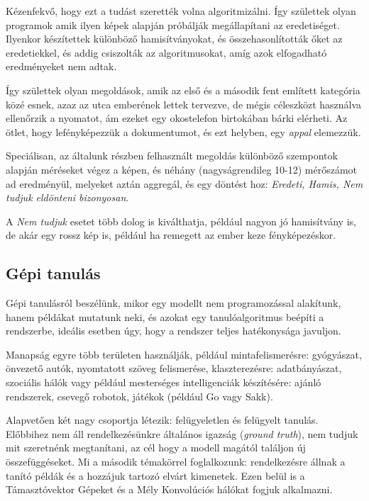 Kézenfekvő, hogy ezt a tudást szerették volna algoritmizálni. Így születtek olyan
programok amik ilyen képek alapján próbálják megállapítani az eredetiséget. 
Ilyenkor készítettek különböző hamisítványokat, és összehasonlították őket az eredetiekkel,
és addig csiszolták az algoritmusokat, amíg azok elfogadható eredményeket nem adtak.


Így születtek olyan megoldások, amik az első és a második fent említett kategória 
közé esnek, azaz az utca emberének lettek tervezve, de mégis céleszközt használva
ellenőrzik a nyomatot, ám ezeket egy okostelefon birtokában bárki elérheti.
Az ötlet, hogy lefényképezzük a dokumentumot, és ezt helyben, egy \textit{appal} elemezzük.


Speciálisan, az általunk részben felhasznált megoldás különböző szempontok alapján méréseket
végez a képen, és néhány (nagyságrendileg 10-12) mérőszámot ad eredményül, melyeket aztán
aggregál, és egy döntést hoz: \textit{Eredeti, Hamis, Nem tudjuk eldönteni bizonyosan}.

A \textit{Nem tudjuk} esetet több dolog is kiválthatja, például nagyon jó hamisítvány is,
de akár egy rossz kép is, például ha remegett az ember keze fényképezéskor.

\subsection{Gépi tanulás}


Gépi tanulásról beszélünk, mikor egy modellt nem programozással alakítunk, hanem példákat 
mutatunk neki, és azokat egy tanulóalgoritmus beépíti a rendszerbe, ideális esetben úgy,
hogy a rendszer teljes hatékonysága javuljon. 

Manapság egyre több területen használják, például mintafelismerésre: gyógyászat, önvezető autók, nyomtatott szöveg felismerése, klaszterezésre: adatbányászat, szociális hálók vagy 
például mesterséges intelligenciák készítésére: ajánló rendszerek, csevegő robotok, játékok (például Go vagy Sakk).

Alapvetően két nagy csoportja létezik: felügyeletlen és felügyelt tanulás.
Előbbihez nem áll rendelkezésünkre általános igazság (\textit{ground truth}), nem
tudjuk mit szeretnénk megtanítani, az cél hogy a modell magától találjon új összefüggéseket.
Mi a második témakörrel foglalkozunk: rendelkezésre állnak a tanító példák és a hozzájuk
tartozó elvárt kimenetek. Ezen belül is a Támasztóvektor Gépeket és a Mély Konvolúciós hálókat
fogjuk alkalmazni.


